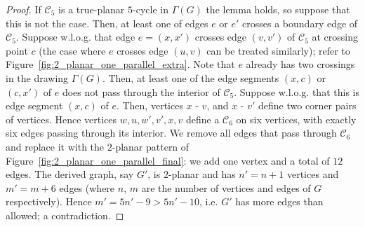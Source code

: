 \begin{proof}

If $\mathcal{C}_5$ is a true-planar $5$-cycle in $\Gamma(G)$ the lemma holds, so 
suppose that this is not the case. Then, at least one of edges $e$ or $e'$ 
crosses a boundary edge of $\mathcal{C}_5$. Suppose w.l.o.g. that  edge 
$e=(x,x')$ crosses edge $(v,v')$ of $\mathcal{C}_5$ at crossing point $c$ (the 
case where $e$ crosses edge $(u,v)$ can be treated similarly); refer to 
Figure~\ref{fig:2_planar_one_parallel_extra}. Note that $e$ already has two 
crossings in the drawing $\Gamma(G)$. Then, at least one of the edge segments 
$(x,c)$ or $(c,x')$ of $e$ does not pass through the interior of 
$\mathcal{C}_5$. Suppose w.l.o.g. that this is edge segment $(x,c)$  of $e$. 
Then, vertices $x$ - $v$, and $x$ - $v'$ define two 
corner pairs of vertices. Hence vertices $w,u,w',v',x,v$ define a \pp 
$\mathcal{C}_6$ on six vertices, with exactly six edges passing through its 
interior. We remove all edges that pass through $\mathcal{C}_6$ and replace it 
with the $2$-planar pattern of Figure~\ref{fig:2_planar_one_parallel_final}: we 
add one vertex and a total of $12$ edges. 
The derived graph, say $G'$, is $2$-planar and has $n'=n+1$ vertices and 
$m'=m+6$ edges (where $n$, $m$ are the number of vertices and edges of $G$ 
respectively). Hence $m'=5n'-9>5n'-10$, i.e. $G'$ has more edges than allowed; a 
contradiction.



\end{proof}
